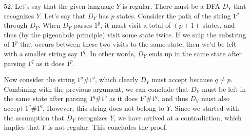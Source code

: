 \documentclass{article}
\begin{document}
52. Let's say that the given language $Y$ is regular. There must be a DFA $D_Y$ that recognizes $Y$. Let's say that $D_Y$ has $p$ states. Consider the path of the string $1^p$ through $D_Y$. When $D_Y$ parses $1^p$, it must visit a total of $(p + 1)$ states, and thus (by the pigeonhole principle) visit some state twice. If we snip the substring of $1^p$ that occurs between these two visits to the same state, then we'd be left with a smaller string say $1^q$. In other words, $D_Y$ ends up in the same state after parsing $1^q$ as it does $1^p$.

Now consider the string $1^p \# 1^q$, which clearly $D_Y$ must accept because $q \ne p$. Combining with the previous argument, we can conclude that $D_Y$ must be left in the same state after parsing $1^q \# 1^q$ as it does $1^p \# 1^q$, and thus $D_Y$ must also accept $1^q \# 1^q$. However, this string does not belong to $Y$. Since we started with the assumption that $D_Y$ recognizes $Y$, we have arrived at a contradiction, which implies that $Y$ is not regular. This concludes the proof.
\end{document}
